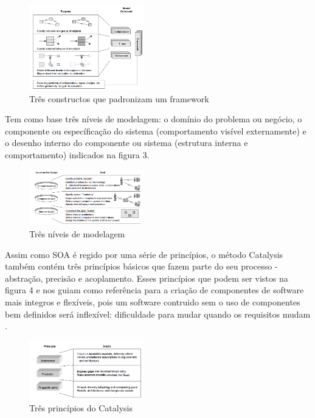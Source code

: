 \documentclass[
	article,			%
	11pt,				%
	oneside,			%
	a4paper,			%
	english,			%
	brazil,				%
	sumario=tradicional
	]{abntex2}
\begin{document}
\begin{figure}[h]
	 \centering 
     \includegraphics[width=5cm]{Images/fig2.png}
     \caption{Três constructos que padronizam um framework}
     \label{Três constructos que padronizam um framework}
\end{figure}

Tem como base três níveis de modelagem: o domínio do problema ou negócio, o componente ou específicação do sistema (comportamento visível externamente) e o desenho interno do componente ou sistema (estrutura interna e comportamento) indicados na figura 3.

\begin{figure}[h]
	 \centering 
     \includegraphics[width=5cm]{Images/fig3.png}
     \caption{Três níveis de modelagem}
     \label{Três níveis de modelagem}
\end{figure}

Assim como SOA é regido por uma série de princípios, o método Catalysis também contém três princípios básicos que fazem parte do seu processo - abstração, precisão e acoplamento. Esses princípios que podem ser vistos na figura 4 e nos guiam como referência para a criação de componentes de software mais integros e flexíveis, pois um software contruido sem o uso de componentes bem definidos será inflexível: dificuldade para mudar quando os requisitos mudam \cite{DSouza1998}.

\begin{figure}[h]
	 \centering 
     \includegraphics[width=5cm]{Images/fig4.png}
     \caption{Três princípios do Catalysis}
     \label{Três princípios do Catalysis}
\end{figure}
\end{document}
